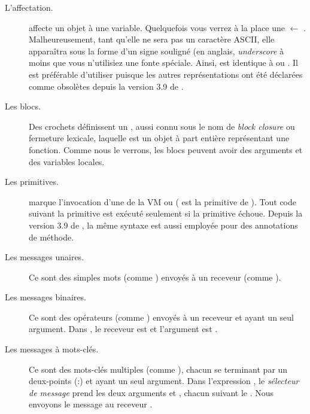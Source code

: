 \documentclass[a4paper,10pt,twoside]{book}
\begin{document}
\begin{description}
\item[L'affectation.]	\ct{:=} affecte un objet \`{a} une variable.
Quelquefois vous verrez \`{a} la place une $\leftarrow$ .
Malheureusement, tant qu'elle ne sera pas un caract\`{e}re
\textsc{ASCII}, elle apparaîtra sous la forme d'un signe souligné (en
anglais, \emph{underscore} \`{a} moins que vous n'utilisiez une fonte 
sp\'{e}ciale.
Ainsi,  est identique \`{a}  ou . Il est préférable d'utiliser  \ct{:=} puisque les autres repr\'{e}sentations ont \'{e}t\'{e} déclarées comme obsolètes depuis la version 3.9 de \sq.

\item[Les blocs.] Des crochets \ct{[ ]} définissent un ,
  aussi connu sous le nom de \emph{block closure} ou fermeture lexicale, laquelle est un objet \`{a} part enti\`{e}re repr\'{e}sentant une fonction.
Comme nous le verrons, les blocs peuvent avoir des arguments et des variables locales.

\item[Les primitives.]	 marque l'invocation
  d'une  de la VM ou 
( est la primitive de ).
Tout code suivant la primitive est ex\'{e}cut\'{e} seulement si la primitive \'{e}choue. Depuis la version 3.9 de \sq, la m\^{e}me syntaxe est aussi employ\'{e}e pour des annotations de m\'{e}thode.

\item[Les messages unaires.] Ce sont des simples mots (comme ) envoy\'{e}s \`{a} un receveur (comme ).

\item[Les messages binaires.] Ce sont des op\'{e}rateurs (comme \ct{+}) envoy\'{e}s \`{a} un receveur et ayant un seul argument. Dans , le receveur est  et l'argument est .

\item[Les messages \`{a} mots-cl\'{e}s.] Ce sont des mots-cl\'{e}s multiples (comme ), chacun se terminant par un deux-points (:) et ayant un seul argument. 
Dans l'expression , le \emph{sélecteur de message}  prend les deux arguments  et , chacun suivant le \lct{:}. Nous envoyons le message au receveur .


\end{description}
\end{document}
